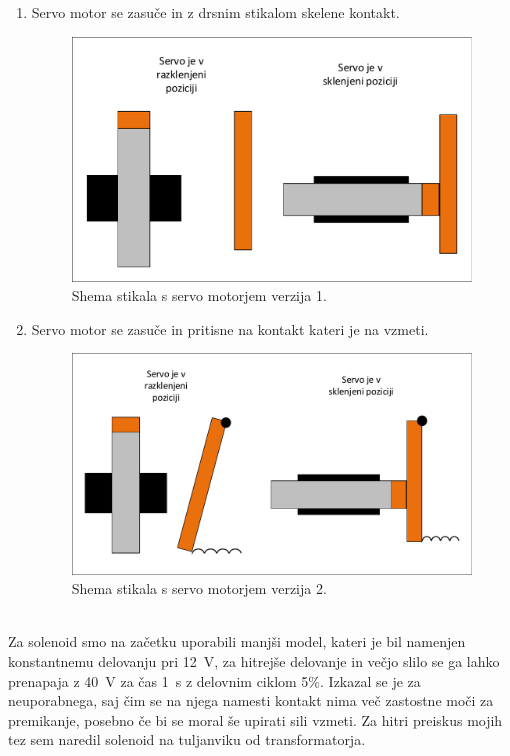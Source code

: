 \documentclass[a4paper,twoside,openright,12pt,slovene]{book}
\begin{document}
\begin{enumerate}
    \item  Servo motor se zasuče in z drsnim stikalom skelene kontakt.
    \begin{figure}[H]
        \centering
        \includegraphics[width=1\columnwidth]{Sheme/StikaloServoVerzija1.pdf}
        \caption{\label{StikaloServoVerzija1} Shema stikala s servo motorjem verzija 1.}
    \end{figure}
    
    \item  Servo motor se zasuče in pritisne na kontakt kateri je na vzmeti.
    \begin{figure}[H]
        \centering
        \includegraphics[width=1\columnwidth]{Sheme/StikaloServoVerzija2.pdf}
        \caption{\label{StikaloServoVerzija2} Shema stikala s servo motorjem verzija 2.}
    \end{figure}
\end{enumerate}


    ~\\Za solenoid smo na začetku uporabili manjši model, kateri je bil namenjen konstantnemu delovanju pri \SI{12}{\volt}, za hitrejše delovanje in večjo slilo se ga lahko prenapaja z  \SI{40}{\volt} za čas  \SI{1}{\second} z delovnim ciklom 5\%. Izkazal se je za neuporabnega, saj čim se na njega namesti kontakt nima več zastostne moči za premikanje, posebno če bi se moral še upirati sili vzmeti. Za hitri preiskus mojih tez sem naredil solenoid na tuljanviku od transformatorja.
    
\end{document}
